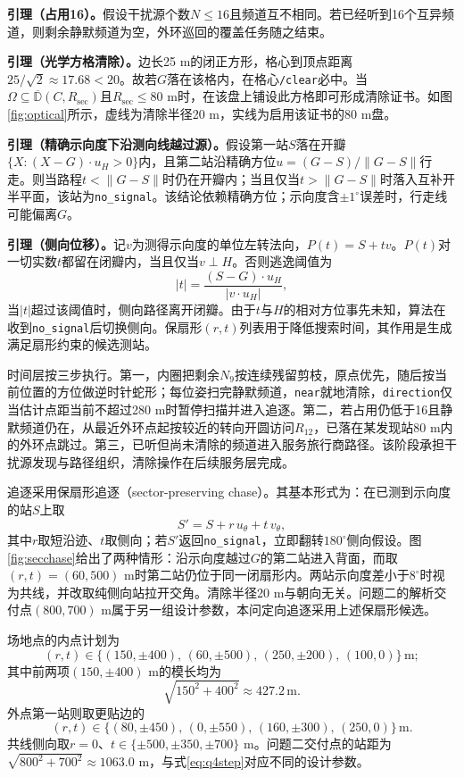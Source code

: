 \documentclass{cumcmthesis}
\begin{document}
\textbf{引理（占用16）。}假设干扰源个数$N\le 16$且频道互不相同。若已经听到16个互异频道，则剩余静默频道为空，外环巡回的覆盖任务随之结束。

\textbf{引理（光学方格清除）。}边长25 m的闭正方形，格心到顶点距离$25/\sqrt{2}\approx 17.68<20$。故若$G$落在该格内，在格心\texttt{/clear}必中。当$\Omega\subseteq\overline{\mathbb{D}}(C,R_{\mathrm{sec}})$且$R_{\mathrm{sec}}\le 80$ m时，在该盘上铺设此方格即可形成清除证书。如图\ref{fig:optical}所示，虚线为清除半径20 m，实线为启用该证书的80 m盘。

\textbf{引理（精确示向度下沿测向线越过源）。}假设第一站$S$落在开瓣$\{X:(X-G)\cdot u_H>0\}$内，且第二站沿精确方位$u=(G-S)/\|G-S\|$行走。则当路程$t<\|G-S\|$时仍在开瓣内；当且仅当$t>\|G-S\|$时落入互补开半平面，该站为\texttt{no\_signal}。该结论依赖精确方位；示向度含$\pm 1^\circ$误差时，行走线可能偏离$G$。

\textbf{引理（侧向位移）。}记$v$为测得示向度的单位左转法向，$P(t)=S+tv$。$P(t)$对一切实数$t$都留在闭瓣内，当且仅当$v\perp H$。否则逃逸阈值为
\[
|t|=\frac{(S-G)\cdot u_H}{|v\cdot u_H|},
\]
当$|t|$超过该阈值时，侧向路径离开闭瓣。由于$t$与$H$的相对方位事先未知，算法在收到\texttt{no\_signal}后切换侧向。保扇形$(r,t)$列表用于降低搜索时间，其作用是生成满足扇形约束的候选测站。

时间层按三步执行。第一，内圈把剩余$N_9$按连续残留剪枝，原点优先，随后按当前位置的方位做逆时针蛇形；每位姿扫完静默频道，\texttt{near}就地清除，\texttt{direction}仅当估计点距当前不超过280 m时暂停扫描并进入追逐。第二，若占用仍低于16且静默频道仍在，从最近外环点起按较近的转向开圆访问$R_{12}$，已落在某发现站80 m内的外环点跳过。第三，已听但尚未清除的频道进入服务旅行商路径。该阶段承担干扰源发现与路径组织，清除操作在后续服务层完成。

追逐采用保扇形追逐（sector-preserving chase）。其基本形式为：在已测到示向度的站$S$上取
\[
S'=S+r\,u_{\theta}+t\,v_{\theta},
\]
其中$r$取短沿迹、$t$取侧向；若$S'$返回\texttt{no\_signal}，立即翻转$180^\circ$侧向假设。图\ref{fig:secchase}给出了两种情形：沿示向度越过$G$的第二站进入背面，而取$(r,t)=(60,500)$ m时第二站仍位于同一闭扇形内。两站示向度差小于$8^\circ$时视为共线，并改取纯侧向站拉开交角。清除半径20 m与朝向无关。问题二的解析交付点$(800,700)$ m属于另一组设计参数，本问定向追逐采用上述保扇形候选。

场地点的内点计划为
\[
(r,t)\in\bigl\{(150,\pm 400),\,(60,\pm 500),\,(250,\pm 200),\,(100,0)\bigr\}\,\mathrm{m};
\]
其中前两项$(150,\pm 400)$ m的模长均为
\begin{equation}
\sqrt{150^2+400^2}\approx 427.2\,\mathrm{m}.
\label{eq:q4step}
\end{equation}
外点第一站则取更贴边的
\[
(r,t)\in\bigl\{(80,\pm 450),\,(0,\pm 550),\,(160,\pm 300),\,(250,0)\bigr\}\,\mathrm{m}.
\]
共线侧向取$r=0$、$t\in\{\pm 500,\pm 350,\pm 700\}$ m。问题二交付点的站距为$\sqrt{800^2+700^2}\approx 1063.0$ m，与式\eqref{eq:q4step}对应不同的设计参数。
\end{document}
